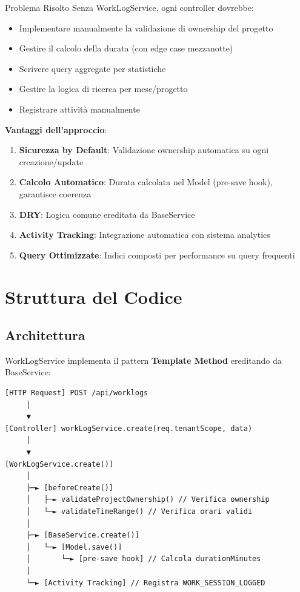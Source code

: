 \documentclass[11pt,a4paper]{article}
\begin{document}
\begin{importantbox}{Problema Risolto}
Senza WorkLogService, ogni controller dovrebbe:
\begin{itemize}
    \item Implementare manualmente la validazione di ownership del progetto
    \item Gestire il calcolo della durata (con edge case mezzanotte)
    \item Scrivere query aggregate per statistiche
    \item Gestire la logica di ricerca per mese/progetto
    \item Registrare attività manualmente
\end{itemize}
\end{importantbox}

\textbf{Vantaggi dell'approccio}:
\begin{enumerate}
    \item \textbf{Sicurezza by Default}: Validazione ownership automatica su ogni creazione/update
    \item \textbf{Calcolo Automatico}: Durata calcolata nel Model (pre-save hook), garantisce coerenza
    \item \textbf{DRY}: Logica comune ereditata da BaseService
    \item \textbf{Activity Tracking}: Integrazione automatica con sistema analytics
    \item \textbf{Query Ottimizzate}: Indici composti per performance su query frequenti
\end{enumerate}

\section{Struttura del Codice}

\subsection{Architettura}

WorkLogService implementa il pattern \textbf{Template Method} ereditando da BaseService:

\begin{lstlisting}
[HTTP Request] POST /api/worklogs
     │
     ▼
[Controller] workLogService.create(req.tenantScope, data)
     │
     ▼
[WorkLogService.create()] 
     │
     ├─► [beforeCreate()] 
     │   ├─► validateProjectOwnership() // Verifica ownership
     │   └─► validateTimeRange() // Verifica orari validi
     │
     ├─► [BaseService.create()] 
     │   └─► [Model.save()] 
     │       └─► [pre-save hook] // Calcola durationMinutes
     │
     └─► [Activity Tracking] // Registra WORK_SESSION_LOGGED
\end{lstlisting}
\end{document}
